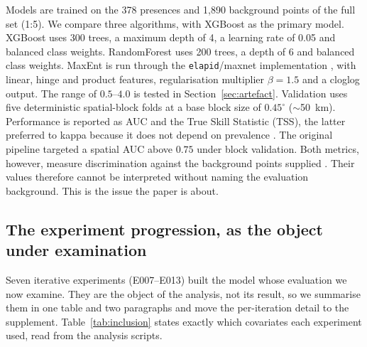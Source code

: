 \documentclass[12pt]{article}
\begin{document}
Models are trained on the 378 presences and 1,890 background points of the full set (1:5).
We compare three algorithms, with XGBoost \citep{chen2016} as the primary model.
XGBoost uses 300 trees, a maximum depth of 4, a learning rate of 0.05 and balanced class weights.
RandomForest \citep{breiman2001} uses 200 trees, a depth of 6 and balanced class weights.
MaxEnt is run through the \texttt{elapid}/maxnet implementation \citep{phillips2006, elith2006}, with linear, hinge and product features, regularisation multiplier $\beta = 1.5$ and a cloglog output.
The range of $0.5$--$4.0$ is tested in Section~\ref{sec:artefact}.
Validation uses five deterministic spatial-block folds at a base block size of $0.45^\circ$ ($\sim$50~km).
Performance is reported as AUC and the True Skill Statistic (TSS), the latter preferred to kappa because it does not depend on prevalence \citep{allouche2006}.
The original pipeline targeted a spatial AUC above $0.75$ under block validation.
Both metrics, however, measure discrimination against the background points supplied \citep{lobo2008, guillera2015}.
Their values therefore cannot be interpreted without naming the evaluation background.
This is the issue the paper is about.

\subsection{The experiment progression, as the object under examination}
\label{sec:progression}

Seven iterative experiments (E007--E013) built the model whose evaluation we now examine.
They are the object of the analysis, not its result, so we summarise them in one table and two paragraphs and move the per-iteration detail to the supplement.
Table~\ref{tab:inclusion} states exactly which covariates each experiment used, read from the analysis scripts.
\end{document}
